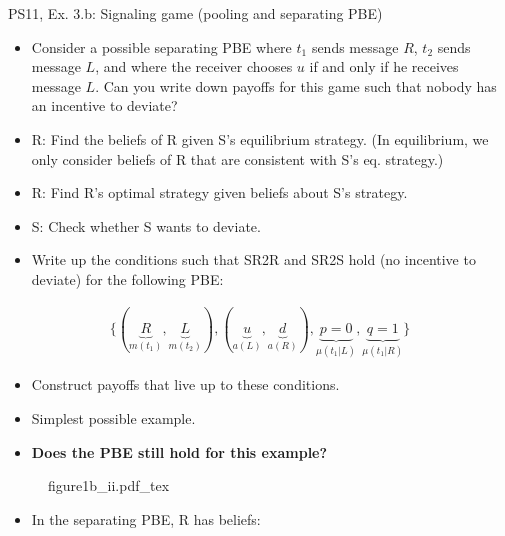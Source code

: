 \begin{frame}{PS11, Ex. 3.b: Signaling game (pooling and separating PBE)}
    \begin{itemize}
        \item[(b)] Consider a possible separating PBE where $t_1$ sends message $R$, $t_2$ sends message $L$, and where the receiver chooses $u$ if and only if he receives message $L$. Can you write down payoffs for this game such that nobody has an incentive to deviate?
    \end{itemize} \vspace{-8pt}
    \begin{multicols}{2}
      \begin{itemize}
        \item[SR3:] R: Find the beliefs of R given S's equilibrium strategy. (In equilibrium, we only consider beliefs of R that are consistent with S's eq. strategy.)
        \item[SR2R:] R: Find R's optimal strategy given beliefs about S's strategy.
        \item[SR2S:] S: Check whether S wants to deviate.
        \item[PBE:]  Write up the conditions such that SR2R and SR2S hold (no incentive to deviate) for the following PBE:
      \end{itemize}\vspace{-14pt}
      \begin{align*}
        \{(\underbrace{R}_{m(t_1)},\underbrace{L}_{m(t_2)}),(\underbrace{u}_{a(L)},\underbrace{d}_{a(R)}),\underbrace{p=0}_{\mu(t_1|L)},\underbrace{q=1}_{\mu(t_1|R)}\}
      \end{align*}\vspace{-12pt}
      \begin{itemize}
        \item[$\rightarrow$] Construct payoffs that live up to these conditions.
        \item[i:] Simplest possible example.
        \item[ii:] \textbf{Does the PBE still hold for this example?}
      \end{itemize}
      \vfill\null\columnbreak
      \begin{figure}[!h]
        \center{}
        {figure1b_ii.pdf_tex}
      \end{figure} \vspace{-8pt}
      \begin{itemize}
        \item[SR3:] In the separating PBE, R has beliefs:\vspace{-10pt}

\end{itemize}
\end{multicols}
\end{frame}
